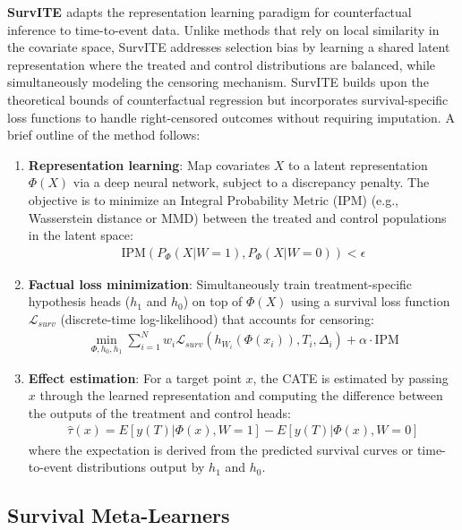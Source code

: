 \documentclass{article} %
\begin{document}
\textbf{SurvITE \citep{curth2021survite}} adapts the representation learning paradigm for counterfactual inference to time-to-event data. Unlike methods that rely on local similarity in the covariate space, SurvITE addresses selection bias by learning a shared latent representation where the treated and control distributions are balanced, while simultaneously modeling the censoring mechanism.
SurvITE builds upon the theoretical bounds of counterfactual regression but incorporates survival-specific loss functions to handle right-censored outcomes without requiring imputation. A brief outline of the method follows:
\begin{enumerate}[leftmargin=20pt, itemsep=0pt,parsep=0pt,partopsep=0pt,topsep=0pt]
    \item \textbf{Representation learning}: Map covariates $X$ to a latent representation $\Phi(X)$ via a deep neural network, subject to a discrepancy penalty. The objective is to minimize an Integral Probability Metric (IPM) (e.g., Wasserstein distance or MMD) between the treated and control populations in the latent space:
        \begin{align*}
            \text{IPM}(P_{\Phi}(X|W=1), P_{\Phi}(X|W=0)) < \epsilon
        \end{align*}
    \item \textbf{Factual loss minimization}: Simultaneously train treatment-specific hypothesis heads ($h_1$ and $h_0$) on top of $\Phi(X)$ using a survival loss function $\mathcal{L}_{surv}$ (discrete-time log-likelihood) that accounts for censoring:
        \begin{align*}
            \min_{\Phi, h_0, h_1} \sum_{i=1}^N w_i \mathcal{L}_{surv}(h_{W_i}(\Phi(x_i)), T_i, \Delta_i) + \alpha \cdot \text{IPM}
        \end{align*}
    \item \textbf{Effect estimation}: For a target point $x$, the CATE is estimated by passing $x$ through the learned representation and computing the difference between the outputs of the treatment and control heads:
        \begin{align*}
             \hat{\tau}(x) = E[y(T)|\Phi(x), W=1] - E[y(T)|\Phi(x), W=0]
        \end{align*}
        where the expectation is derived from the predicted survival curves or time-to-event distributions output by $h_1$ and $h_0$.
\end{enumerate}


\subsection{Survival Meta-Learners}
\end{document}
